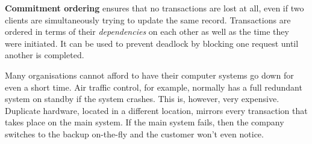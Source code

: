 \documentclass[../main.tex]{subfile}
\begin{document}
\textbf{Commitment ordering} ensures that no transactions are lost at all, even if two clients are simultaneously trying to update the same record. Transactions are ordered in terms of their \textit{dependencies} on each other as well as the time they were initiated. It can be used to prevent deadlock by blocking one request until another is completed.


Many organisations cannot afford to have their computer systems go down for even a short time. Air traffic control, for example, normally has a full redundant system on standby if the system crashes. This is, however, very expensive. Duplicate hardware, located in a different location, mirrors every transaction that takes place on the main system. If the main system fails, then the company switches to the backup on-the-fly and the customer won't even notice.
\end{document}
